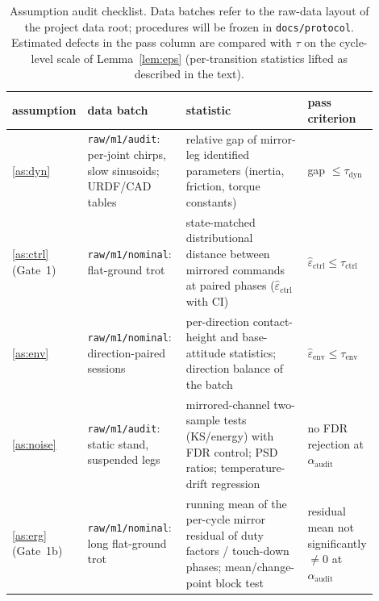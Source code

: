 \begin{table}[ht]
\centering
\small
\begin{tabular}{@{}p{0.11\linewidth}p{0.27\linewidth}p{0.34\linewidth}p{0.18\linewidth}@{}}
\toprule
assumption & data batch & statistic & pass criterion \\
\midrule
\ref{as:dyn} &
\texttt{raw/m1/audit}: per-joint chirps, slow sinusoids; URDF/CAD tables &
relative gap of mirror-leg identified parameters (inertia, friction, torque
constants) &
gap $\le \tau_{\mathrm{dyn}}$ \\
\ref{as:ctrl} (Gate~1) &
\texttt{raw/m1/nominal}: flat-ground trot &
state-matched distributional distance between mirrored commands at paired
phases ($\hat\varepsilon_{\mathrm{ctrl}}$ with CI) &
$\hat\varepsilon_{\mathrm{ctrl}} \le \tau_{\mathrm{ctrl}}$ \\
\ref{as:env} &
\texttt{raw/m1/nominal}: direction-paired sessions &
per-direction contact-height and base-attitude statistics; direction balance
of the batch &
$\hat\varepsilon_{\mathrm{env}} \le \tau_{\mathrm{env}}$ \\
\ref{as:noise} &
\texttt{raw/m1/audit}: static stand, suspended legs &
mirrored-channel two-sample tests (KS/energy) with FDR control; PSD ratios;
temperature-drift regression &
no FDR rejection at $\alpha_{\mathrm{audit}}$ \\
\ref{as:erg} (Gate~1b) &
\texttt{raw/m1/nominal}: long flat-ground trot &
running mean of the per-cycle mirror residual of duty factors / touch-down
phases; mean/change-point block test &
residual mean not significantly $\neq 0$ at $\alpha_{\mathrm{audit}}$ \\
\bottomrule
\end{tabular}
\caption{Assumption audit checklist. Data batches refer to the raw-data layout
of the project data root; procedures will be frozen in
\texttt{docs/protocol}. Estimated defects in the pass column are compared
with $\tau$ on the cycle-level scale of Lemma~\ref{lem:eps} (per-transition
statistics lifted as described in the text).}
\label{tab:audit}
\end{table}
